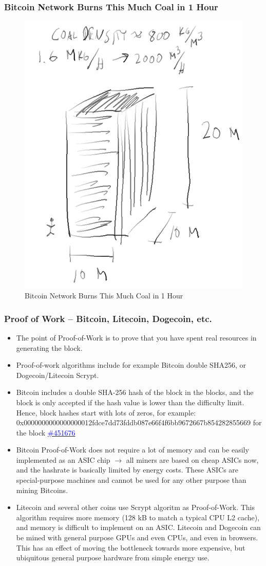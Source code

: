 \documentclass[8pt]{beamer}
\begin{document}
\begin{frame}
\frametitle{Bitcoin Network Burns This Much Coal in 1 Hour}

\begin{figure}[tb]
 \centering
 \includegraphics[width=5 cm,keepaspectratio=true]{./blockchain_images/coal.png}
 \caption{Bitcoin Network Burns This Much Coal in 1 Hour}
\end{figure}

\end{frame}

\begin{frame}
\frametitle{Proof of Work – Bitcoin, Litecoin, Dogecoin, etc.}

\begin{itemize}
 \item The point of Proof-of-Work is to prove that you have spent real resources in generating the block.
 \item Proof-of-work algorithms include for example Bitcoin double SHA256, or Dogecoin/Litecoin Scrypt.
 \item Bitcoin includes a double SHA-256 hash of the block in the blocks, and the block is only accepted if the hash value is lower than the difficulty limit. Hence, block hashes start with lots of zeros, for example:
       0x0000000000000000012fdce7dd73fddb087e66f4f6bb9672667b854282855669 for the block 
       \href{https://blockexplorer.com/block/0000000000000000012fdce7dd73fddb087e66f4f6bb9672667b854282855669}{\textcolor{blue}{\#451676}}
 \item Bitcoin Proof-of-Work does not require a lot of memory and can be easily implemented as an ASIC chip $ \rightarrow $ all miners are based on cheap ASICs now, and the hashrate is basically limited by energy costs.
       These ASICs are special-purpose machines and cannot be used for any other purpose than mining Bitcoins.
 \item Litecoin and several other coins use Scrypt algoritm as Proof-of-Work. This algorithm requires more memory (128 kB to match a typical CPU L2 cache), and memory is difficult to implement on an ASIC.
       Litecoin and Dogecoin can be mined with general purpose GPUs and even CPUs, and even in browsers. This has an effect of moving the bottleneck towards more expensive, but ubiquitous general purpose hardware
       from simple energy use.
\end{itemize}
\end{frame}
\end{document}
